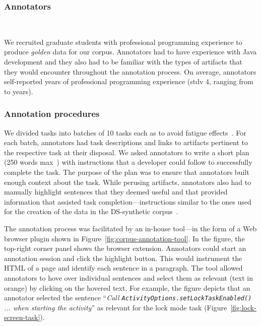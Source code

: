 \subsubsection{Annotators}
\textcolor{white}{force ident} %

We recruited  graduate students with professional programming experience to produce \textit{golden} data for our corpus. Annotators had to have experience with Java development and they also had to be familiar with the types of artifacts that they would encounter throughout the annotation process. 
On average, annotators self-reported  years of professional
programming experience (stdv 4, ranging from  to  years).



\subsubsection{Annotation procedures}



We divided tasks into batches of 10 tasks each as to avoid fatigue effects~\cite{Ponzanelli2017}. For each batch, annotators had task descriptions and links to artifacts pertinent to the respective task at their disposal. We asked annotators to write a short plan (250 words max~\cite{Rastkar2010}) with instructions that a developer could follow to successfully complete the task. 
The purpose of the plan was to ensure that annotators built enough context about the task.
While perusing artifacts, annotators also had to manually highlight sentences that they deemed useful and that provided information that assisted task completion---instructions similar to the ones used for the creation of the 
 data in the \acs{DS-synthetic} corpus~\cite{marques2020}.


The annotation process was facilitated by an in-house tool---in the form of a Web browser plugin shown in Figure~\ref{fig:corpus-annotation-tool}. In the figure, the top-right corner panel shows the browser extension. Annotators could start an annotation session and click the highlight button.
This would instrument the HTML of a page and identify each sentence in a paragraph. The tool allowed annotators to hove over individual sentences and select them as relevant (text in orange) by clicking on the hovered text. For example, the figure depicts that an annotator selected  the sentence
``\textit{Call {\small \texttt{ActivityOptions.setLockTaskEnabled()}} ... when starting the activity}'' as relevant for the lock mode task (Figure~\ref{fig:lock-screen-task}).







